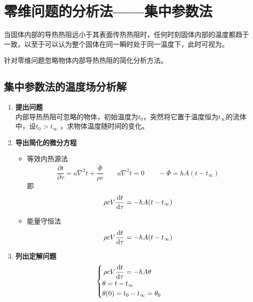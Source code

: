 \section{零维问题的分析法——集中参数法}
\tdefination[零维问题]
当固体内部的导热热阻远小于其表面传热热阻时，任何时刻固体内部的温度都趋于一致，以至于可以认为整个固体在同一瞬时处于同一温度下，此时可视为。

针对零维问题忽略物体内部导热热阻的简化分析方法。
\vspace*{0.5em}

\subsection{集中参数法的温度场分析解}
\begin{enumerate}[\textbf{步骤} 1 ]
	\item \textbf{提出问题}\\
	\hspace*{2em} 内部导热热阻可忽略的物体，初始温度为$t_0$，突然将它置于温度恒为$t_\infty$的流体中，设$t_0 > t_\infty$ ，求物体温度随时间的变化。
	
	\item \textbf{导出简化的微分方程}
	\begin{itemize}
		\item 等效内热源法
		\[
			\dfrac{\partial t}{\partial \tau} = a \nabla^2 t + \dfrac{\dot{\varPhi}}{\rho c} \quad\quad a \nabla^2 t = 0 
			\quad\quad - \dot{\varPhi} = hA(t - t_\infty)
		\]
		即
		\begin{equation}
			\rho c V\dfrac{{\rm{d}} t}{{\rm{d}} \tau} = - h A(t - t_\infty)
		\end{equation}
		
		\item 能量守恒法
		\begin{equation}
			\rho c V\dfrac{{\rm{d}} t}{{\rm{d}} \tau} = - h A(t - t_\infty)
		\end{equation}
	\end{itemize}
	
	\item \textbf{列出定解问题}
	\begin{equation}
		\begin{cases}
			\, \rho c V\dfrac{{\rm{d}} t}{{\rm{d}} \tau} = - h A \theta \\
			\theta = t - t_\infty \\
			\theta(0) = t_0 - t_\infty = \theta_0
		\end{cases}
	\end{equation}
	

\end{enumerate}
